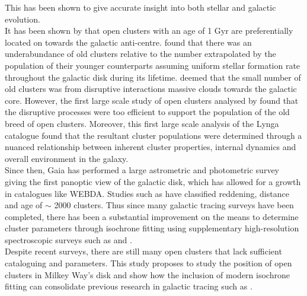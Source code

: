  This has been shown to give accurate insight into both stellar and galactic evolution. \\  It has been shown by \cite{1980A&A....88..360V} that open clusters with an age of 1 Gyr are preferentially located on towards the galactic anti-centre. \cite{1950BAN....11...91O} found that there was an underabundance of old clusters relative to the number extrapolated by the population of their younger counterparts assuming uniform stellar formation rate throughout the galactic disk during its lifetime. \cite{1958ApJ...127...17S} deemed that the small number of old clusters was from disruptive interactions massive clouds towards the galactic core. However, the first large scale study of open clusters analysed by \cite{1988AJ.....95..771J} found that the disruptive processes were too efficient to support the population of the old breed of open clusters. Moreover, this first large scale analysis of the Lynga catalogue \citep{1982A&A...109..213L} found that the resultant cluster populations were determined through a nuanced relationship between inherent cluster properties, internal dynamics and overall environment in the galaxy. \\ Since then, Gaia has performed a large astrometric and photometric survey giving the first panoptic view of the galactic disk, which has allowed for a growth in catalogues like WEBDA. Studies such as \cite{2020A&A...640A...1C} have classified reddening, distance and age of $\sim$ 2000 clusters. Thus since many galactic tracing surveys have been completed, there has been a substantial improvement on the means to determine cluster parameters through isochrone fitting using supplementary high-resolution spectroscopic surveys such as \cite{Metallicity_catalogue} and \cite{2022MNRAS.509.1664J}. \\ Despite recent surveys, there are still many open clusters that lack sufficient cataloguing and parameters. This study proposes to study the position of open clusters in Milkey Way's disk and show how the inclusion of modern isochrone fitting can consolidate previous research in galactic tracing such as \cite{1982A&A...109..213L}. 
